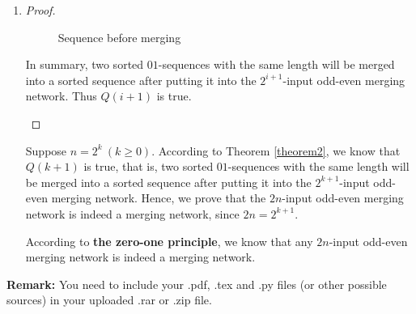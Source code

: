 \documentclass[12pt,a4paper]{article}
\makeatletter
\newtheorem*{solution}{Solution}
\theoremstyle{definition}
\renewenvironment{solution}[1][Solution] {\par\pushQED{\qed}\normalfont\topsep6\p@\@plus6\p@\relax\trivlist\item[\hskip\labelsep\bfseries#1\@addpunct{.}]\ignorespaces}{\popQED\endtrivlist\@endpefalse} \makeatother
\makeatother
\begin{document}
\begin{enumerate}
\begin{solution}
\begin{enumerate}
\begin{proof}
\begin{itemize}
\begin{figure}[h]
{\begin{minipage}[t]{0.3\linewidth}
                    \end{minipage}
                    \label{fig:2b}
                }
                \caption{Sequence before merging}\label{fig:2}
            \end{figure}
                In summary, two sorted $01$-sequences with the same length will be merged into a sorted sequence after putting it into the $2^{i+1}$-input odd-even merging network. Thus $Q(i+1)$ is true.
            \end{itemize}
        \end{proof}

        Suppose $n = 2^k\ (k \geq 0)$. According to Theorem \ref{theorem2}, we know that $Q(k+1)$ is true, that is, two sorted $01$-sequences with the same length will be merged into a sorted sequence after putting it into the $2^{k+1}$-input odd-even merging network. Hence, we prove that the $2n$-input odd-even merging network is indeed a merging network, since $2n = 2^{k+1}$.

        According to \textbf{the zero-one principle}, we know that any $2n$-input odd-even merging network is indeed a merging network.
    \end{enumerate}
    \end{solution}

\end{enumerate}

\vspace{20pt}

\textbf{Remark:} You need to include your .pdf, .tex and .py files (or other possible sources) in your uploaded .rar or .zip file.

\end{document}
